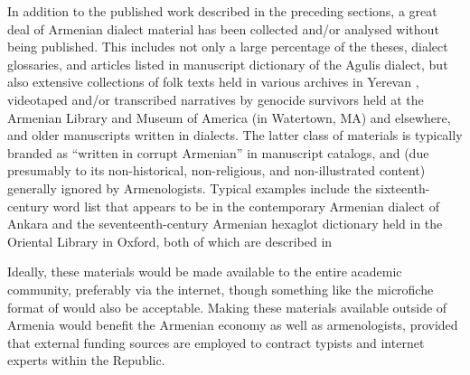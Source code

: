 
In addition to the published work described in the preceding sections, a great deal of Armenian dialect material has been collected and/or analysed without being published. This includes not only a large percentage of the theses, dialect glossaries, and articles listed in  manuscript dictionary of the Agulis dialect, but also extensive collections of folk texts held in various archives in Yerevan , videotaped and/or transcribed narratives by genocide survivors held at the Armenian Library and Museum of America (in Watertown, MA) and elsewhere,  and older manuscripts written in dialects. The latter class of materials is typically branded as ``written in corrupt Armenian'' in manuscript catalogs, and (due presumably to its non-historical, non-religious, and non-illustrated content) generally ignored by Armenologists. Typical examples include the sixteenth-century word list that appears to be in the contemporary Armenian dialect of Ankara and the seventeenth-century Armenian hexaglot dictionary held in the Oriental Library in Oxford, both of which are described in 


Ideally, these materials would be made available to the entire academic community, preferably via the internet, though something like the microfiche format of  would also be acceptable. Making these materials available outside of Armenia would benefit the Armenian economy as well as armenologists, provided that external funding sources are employed to contract typists and internet experts within the Republic.

